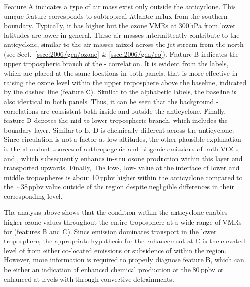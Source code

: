 Feature A indicates a type of air mass exist only outside the anticyclone. This unique feature corresponds to subtropical Atlantic
influx from the southern boundary. Typically, it has higher  but the ozone VMRs at 300\,\unit{hPa} from lower latitudes are
lower in general. These air masses intermittently contribute to the anticyclone, similar to the air masses mixed across the jet stream
from the north (see Sect.~\ref{ssec:2006/gen/ozone} \& \ref{ssec:2006/gen/co}). Feature B indicates the upper tropospheric branch
of the - correlation. It is evident from the labels, which are placed at the same locations in both panels, that
 is more effective in raising the ozone level within the upper troposphere above the baseline, indicated by the dashed
line (feature C). Similar to the alphabetic labels, the baseline is also identical in both panels. Thus, it can be seen that the background
- correlations are consistent both inside and outside the anticyclone. Finally, feature D denotes the mid-to-lower
tropospheric branch, which includes the boundary layer. Similar to B, D is chemically different across the anticyclone. Since circulation
is not a factor at low altitudes, the other plausible explanation is the abundant sources of anthropogenic and biogenic emissions of both
VOCs and , which subsequently enhance in-situ ozone production within this layer and transported upwards. Finally,
The low-, low-  value at the interface of lower and middle tropospheres is about 10\,\unit{ppbv} higher within
the anticyclone compared to the $\sim38$\,\unit{ppbv} value outside of the region despite negligible differences in their corresponding
 level.

The analysis above shows that the condition within the anticyclone enables higher ozone values throughout the entire troposphere at
a wide range of VMRs for  (features B and C). Since emission dominates transport in the lower
troposphere, the appropriate hypothesis for the enhancement at C is the elevated level of  from either co-located
emissions or subsidence of {\lnox} within the region. However, more information is required to properly diagnose feature B, which
can be either an indication of enhanced  chemical production at the 80\,\unit{ppbv}  or enhanced 
at levels with  through convective detrainments.


